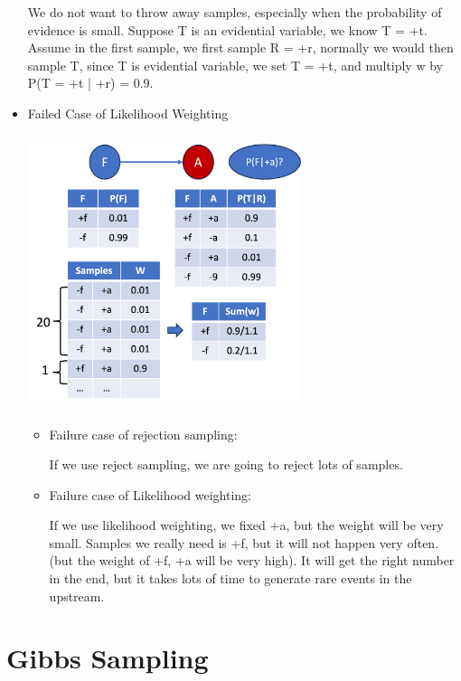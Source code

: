 \documentclass[11pt,a4paper]{report}
\begin{document}
\begin{itemize}
    We do not want to throw away samples, especially when the probability of evidence is small.
    Suppose T is an evidential variable, we know T = +t. Assume in the first sample, we first sample R = +r, normally we would then sample T, since T is evidential variable, we set T = +t, and multiply w by P(T = +t | +r) = 0.9.

    \item Failed Case of Likelihood Weighting

    \includegraphics[width=8cm, height = 8cm]{sampling_eg_lik_neg.png}\\

    \begin{itemize}
        \item Failure case of rejection sampling:
        
        If we use reject sampling, we are going to reject lots of samples.

        \item Failure case of Likelihood weighting:
        
        If we use likelihood weighting, we fixed +a, but the weight will be very small. 
        Samples we really need is +f, but it will not happen very often. (but the weight of +f, +a will be very high).
        It will get the right number in the end, but it takes lots of time to generate rare events in the upstream.
    \end{itemize}

\end{itemize}

\section{Gibbs Sampling}
\end{document}
